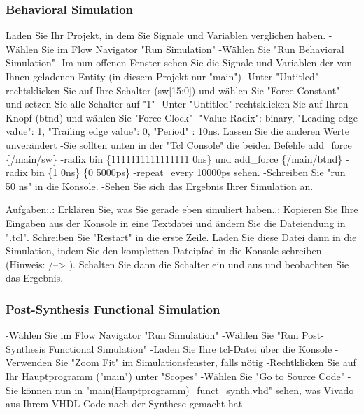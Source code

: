 \documentclass{article}
\begin{document}
\subsubsection{Behavioral Simulation}
Laden Sie Ihr Projekt, in dem Sie Signale und Variablen verglichen haben. \newline
-W\"ahlen Sie im Flow Navigator "Run Simulation"\newline
-W\"ahlen Sie "Run Behavioral Simulation"\newline
-Im nun offenen Fenster sehen Sie die Signale und Variablen der von Ihnen geladenen Entity (in diesem Projekt nur "main")\newline
-Unter "Untitled" rechtsklicken Sie auf Ihre Schalter (sw[15:0]) und w\"ahlen Sie "Force Constant" und setzen Sie alle Schalter auf "1"\newline
-Unter "Untitled" rechtsklicken Sie auf Ihren Knopf (btnd) und w\"ahlen Sie "Force Clock"\newline
-"Value Radix": binary, "Leading edge value": 1, "Trailing edge value": 0, "Period" : 10ns. Lassen Sie die anderen Werte unver\"andert\newline
-Sie sollten unten in der "Tcl Console" die beiden Befehle\newline
add\_force \{/main/sw\} -radix bin \{1111111111111111 0ns\} und \newline
add\_force \{/main/btnd\} -radix bin \{1 0ns\} \{0 5000ps\} -repeat\_every 10000ps sehen.\newline
-Schreiben Sie "run 50 ns" in die Konsole.\newline
-Sehen Sie sich das Ergebnis Ihrer Simulation an.\newline

Aufgaben:.: Erkl\"aren Sie, was Sie gerade eben simuliert haben..: Kopieren Sie Ihre Eingaben aus der Konsole in eine Textdatei und \"andern Sie die Dateiendung in ".tcl". Schreiben Sie "Restart" in die erste Zeile. Laden Sie diese  Datei dann in die Simulation, indem Sie den kompletten Dateipfad in die Konsole schreiben. (Hinweis: /--> ). Schalten Sie dann die Schalter ein und aus und beobachten Sie das Ergebnis.

\subsubsection{Post-Synthesis Functional Simulation}
-W\"ahlen Sie im Flow Navigator "Run Simulation"\newline
-W\"ahlen Sie "Run Post-Synthesis Functional Simulation"\newline
-Laden Sie Ihre tcl-Datei \"uber die Konsole\newline
-Verwenden Sie "Zoom Fit" im Simulationsfenster, falls n\"otig\newline
-Rechtklicken Sie auf Ihr Hauptprogramm ("main") unter "Scopes"\newline
-W\"ahlen Sie "Go to Source Code"\newline
-Sie k\"onnen nun in "main(Hauptprogramm)\_funct\_synth.vhd" sehen, was Vivado aus Ihrem VHDL Code nach der Synthese gemacht hat\newline
\end{document}
